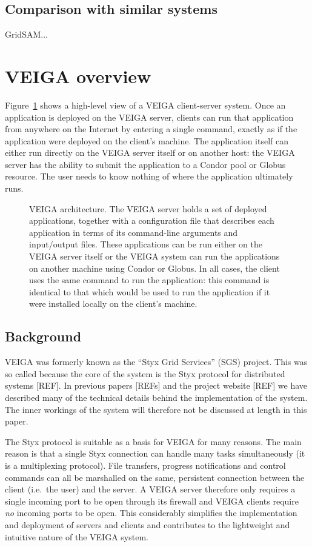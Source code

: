 \documentclass[a4paper]{article}
\begin{document}
\begin{multicols}{2}
\subsection{Comparison with similar systems}
GridSAM... 

\section{VEIGA overview}
Figure~\ref{fig:veigaarchitecture} shows a high-level view of a VEIGA client-server system.  Once an application is deployed on the VEIGA server, clients can run that application from anywhere on the Internet by entering a single command, exactly as if the application were deployed on the client's machine.  The application itself can either run directly on the VEIGA server itself or on another host: the VEIGA server has the ability to submit the application to a Condor pool or Globus resource.  The user needs to know nothing of where the application ultimately runs.

\begin{figure}
\centering
\caption{VEIGA architecture.  The VEIGA server holds a set of deployed applications, together with a configuration file that describes each application in terms of its command-line arguments and input/output files.  These applications can be run either on the VEIGA server itself or the VEIGA system can run the applications on another machine using Condor or Globus.  In all cases, the client uses the same command to run the application: this command is identical to that which would be used to run the application if it were installed locally on the client's machine.}
\label{fig:veigaarchitecture}
\end{figure}

\subsection{Background}
VEIGA was formerly known as the ``Styx Grid Services'' (SGS) project.  This was so called because the core of the system is the Styx protocol for distributed systems [REF].  In previous papers [REFs] and the project website [REF] we have described many of the technical details behind the implementation of the system.  The inner workings of the system will therefore not be discussed at length in this paper.

The Styx protocol is suitable as a basis for VEIGA for many reasons.  The main reason is that a single Styx connection can handle many tasks simultaneously (it is a multiplexing protocol).  File transfers, progress notifications and control commands can all be marshalled on the same, persistent connection between the client (i.e.\ the user) and the server.  A VEIGA server therefore only requires a single incoming port to be open through its firewall and VEIGA clients require {\em no\/} incoming ports to be open.  This considerably simplifies the implementation and deployment of servers and clients and contributes to the lightweight and intuitive nature of the VEIGA system.



\end{multicols}
\end{document}
